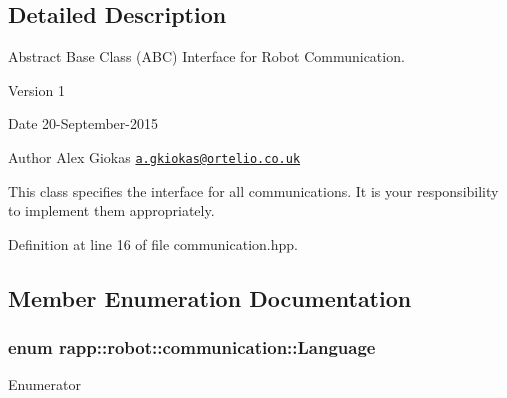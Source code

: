 \subsection{Detailed Description}
Abstract Base Class (A\-B\-C) Interface for Robot Communication. 

\begin{DoxyVersion}{Version}
1 
\end{DoxyVersion}
\begin{DoxyDate}{Date}
20-\/\-September-\/2015 
\end{DoxyDate}
\begin{DoxyAuthor}{Author}
Alex Giokas \href{mailto:a.gkiokas@ortelio.co.uk}{\tt a.\-gkiokas@ortelio.\-co.\-uk}
\end{DoxyAuthor}
This class specifies the interface for all communications. It is your responsibility to implement them appropriately. 

Definition at line 16 of file communication.\-hpp.



\subsection{Member Enumeration Documentation}
\hypertarget{classrapp_1_1robot_1_1communication_aa68950f71c5f18df6816725b50c3c62e}{
\subsubsection[{Language}]{\setlength{\rightskip}{0pt plus 5cm}enum {\bf rapp\-::robot\-::communication\-::\-Language}\hspace{0.3cm}{\ttfamily [strong]}}}\label{classrapp_1_1robot_1_1communication_aa68950f71c5f18df6816725b50c3c62e}
\begin{Desc}
\item[Enumerator]\par
\begin{description}
\item[{\em 
\hypertarget{classrapp_1_1robot_1_1communication_aa68950f71c5f18df6816725b50c3c62ea11040bd29db4ec9964af9fd3f9a24f17}{E\-N\-G\-L\-I\-S\-H}\label{classrapp_1_1robot_1_1communication_aa68950f71c5f18df6816725b50c3c62ea11040bd29db4ec9964af9fd3f9a24f17}
}]\item[{\em 
\hypertarget{classrapp_1_1robot_1_1communication_aa68950f71c5f18df6816725b50c3c62ead4cacc28e56302bcec9d7af4bba8c9a7}{G\-R\-E\-E\-K}\label{classrapp_1_1robot_1_1communication_aa68950f71c5f18df6816725b50c3c62ead4cacc28e56302bcec9d7af4bba8c9a7}
}]\end{description}
\end{Desc}


